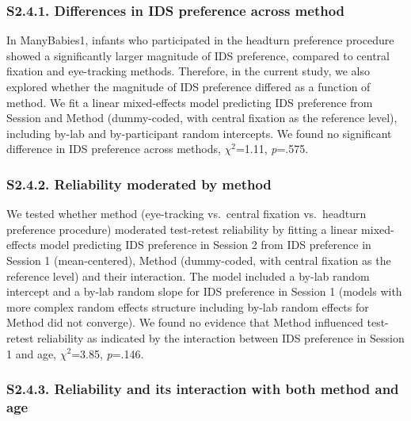 \documentclass[
  man, donotrepeattitle,floatsintext]{apa6}
\begin{document}
\hypertarget{s2.4.1.-differences-in-ids-preference-across-method}{%
\subsubsection{S2.4.1. Differences in IDS preference across method}\label{s2.4.1.-differences-in-ids-preference-across-method}}

In ManyBabies1, infants who participated in the headturn preference procedure showed a significantly larger magnitude of IDS preference, compared to central fixation and eye-tracking methods. Therefore, in the current study, we also explored whether the magnitude of IDS preference differed as a function of method. We fit a linear mixed-effects model predicting IDS preference from Session and Method (dummy-coded, with central fixation as the reference level), including by-lab and by-participant random intercepts. We found no significant difference in IDS preference across methods, \({\chi}^2\)=1.11, \emph{p}=.575.

\hypertarget{s2.4.2.-reliability-moderated-by-method}{%
\subsubsection{S2.4.2. Reliability moderated by method}\label{s2.4.2.-reliability-moderated-by-method}}

We tested whether method (eye-tracking vs.~central fixation vs.~headturn preference procedure) moderated test-retest reliability by fitting a linear mixed-effects model predicting IDS preference in Session 2 from IDS preference in Session 1 (mean-centered), Method (dummy-coded, with central fixation as the reference level) and their interaction.
The model included a by-lab random intercept and a by-lab random slope for IDS preference in Session 1 (models with more complex random effects structure including by-lab random effects for Method did not converge).
We found no evidence that Method influenced test-retest reliability as indicated by the interaction between IDS preference in Session 1 and age, \({\chi}^2\)=3.85, \emph{p}=.146.

\hypertarget{s2.4.3.-reliability-and-its-interaction-with-both-method-and-age}{%
\subsubsection{S2.4.3. Reliability and its interaction with both method and age}\label{s2.4.3.-reliability-and-its-interaction-with-both-method-and-age}}
\end{document}
